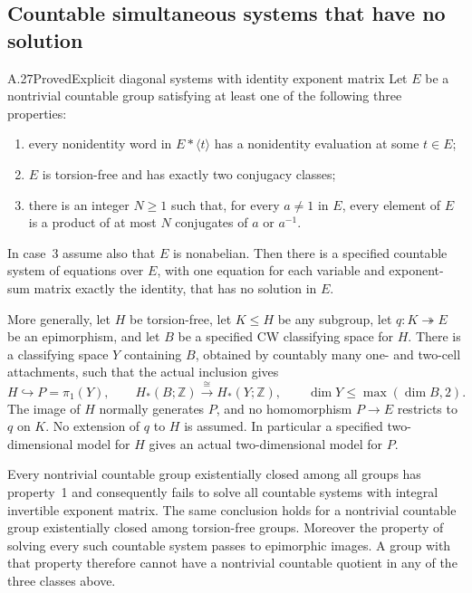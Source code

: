 \subsection{Countable simultaneous systems that have no solution}

\begin{claim}{A.27}{Proved}{Explicit diagonal systems with identity exponent matrix}
Let $E$ be a nontrivial countable group satisfying at least one of
the following three properties:
\begin{enumerate}
\item every nonidentity word in $E*\langle t\rangle$ has a
nonidentity evaluation at some $t\in E$;
\item $E$ is torsion-free and has exactly two conjugacy classes;
\item there is an integer $N\geq1$ such that, for every
$a\ne1$ in $E$, every element of $E$ is a product of at most
$N$ conjugates of $a$ or $a^{-1}$.
\end{enumerate}
In case~3 assume also that $E$ is nonabelian. Then there is a
specified countable system of equations over $E$, with one
equation for each variable and exponent-sum matrix exactly the
identity, that has no solution in $E$.

More generally, let $H$ be torsion-free, let $K\leq H$ be
any subgroup, let $q:K\twoheadrightarrow E$ be an epimorphism,
and let $B$ be a specified CW classifying space for $H$.
There is a classifying space $Y$
containing $B$, obtained by countably many one- and two-cell
attachments, such that the actual inclusion gives
\[
 H\hookrightarrow P=\pi_1(Y),\qquad
 H_*(B;\mathbb Z)\xrightarrow{\cong}H_*(Y;\mathbb Z),
 \qquad \dim Y\leq\max(\dim B,2).
 \tag{A.27.1}
\]
The image of $H$ normally generates $P$, and no homomorphism
$P\to E$ restricts to $q$ on $K$. No extension of $q$ to $H$
is assumed. In particular a specified two-dimensional
model for $H$ gives an actual two-dimensional model for $P$.

Every nontrivial countable group existentially closed among all
groups has property~1 and consequently fails to solve all
countable systems with integral invertible exponent matrix.
The same conclusion holds for a nontrivial countable group
existentially closed among torsion-free groups. Moreover the
property of solving every such countable system passes to
epimorphic images. A group with that property therefore cannot
have a nontrivial countable quotient in any of the three
classes above.
\end{claim}


